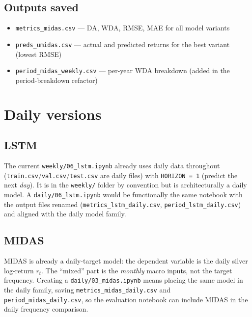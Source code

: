 \documentclass[12pt, a4paper]{article}
\begin{document}
\subsection{Outputs saved}

\begin{itemize}
  \item \texttt{metrics\_midas.csv} --- DA, WDA, RMSE, MAE for all model variants
  \item \texttt{preds\_umidas.csv} --- actual and predicted returns for the best
    variant (lowest RMSE)
  \item \texttt{period\_midas\_weekly.csv} --- per-year WDA breakdown (added in the
    period-breakdown refactor)
\end{itemize}

\section{Daily versions}

\subsection{LSTM}

The current \texttt{weekly/06\_lstm.ipynb} already uses daily data throughout
(\texttt{train.csv}/\texttt{val.csv}/\texttt{test.csv} are daily files) with
\texttt{HORIZON = 1} (predict the next \emph{day}). It is in the \texttt{weekly/}
folder by convention but is architecturally a daily model. A \texttt{daily/06\_lstm.ipynb}
would be functionally the same notebook with the output files renamed
(\texttt{metrics\_lstm\_daily.csv}, \texttt{period\_lstm\_daily.csv}) and aligned
with the daily model family.

\subsection{MIDAS}

MIDAS is already a daily-target model: the dependent variable is the daily silver
log-return $r_t$. The ``mixed'' part is the \emph{monthly} macro inputs, not the
target frequency. Creating a \texttt{daily/03\_midas.ipynb} means placing the same
model in the daily family, saving \texttt{metrics\_midas\_daily.csv} and
\texttt{period\_midas\_daily.csv}, so the evaluation notebook can include MIDAS in
the daily frequency comparison.
\end{document}
